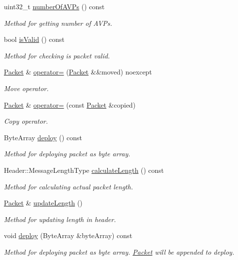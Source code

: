 \begin{DoxyCompactItemize}
uint32\+\_\+t \hyperlink{classDiameter_1_1Packet_a9b11aa0f60e2a9cec525d98f6b1d8808}{number\+Of\+A\+V\+Ps} () const
\begin{DoxyCompactList}\small\item\em Method for getting number of A\+V\+Ps. \end{DoxyCompactList}\item 
bool \hyperlink{classDiameter_1_1Packet_ab6077555d623ff342c4821c0a0e29285}{is\+Valid} () const
\begin{DoxyCompactList}\small\item\em Method for checking is packet valid. \end{DoxyCompactList}\item 
\hyperlink{classDiameter_1_1Packet}{Packet} \& \hyperlink{classDiameter_1_1Packet_a80abbedae208ece043c406a87b8876af}{operator=} (\hyperlink{classDiameter_1_1Packet}{Packet} \&\&moved) noexcept
\begin{DoxyCompactList}\small\item\em Move operator. \end{DoxyCompactList}\item 
\hyperlink{classDiameter_1_1Packet}{Packet} \& \hyperlink{classDiameter_1_1Packet_a38f277e129b9b7d7e31188b48d947506}{operator=} (const \hyperlink{classDiameter_1_1Packet}{Packet} \&copied)
\begin{DoxyCompactList}\small\item\em Copy operator. \end{DoxyCompactList}\item 
Byte\+Array \hyperlink{classDiameter_1_1Packet_a6120f6d21c5d2f4c4ed4a8602953923c}{deploy} () const
\begin{DoxyCompactList}\small\item\em Method for deploying packet as byte array. \end{DoxyCompactList}\item 
Header\+::\+Message\+Length\+Type \hyperlink{classDiameter_1_1Packet_ae9926218252f08fcdbc937d16d496984}{calculate\+Length} () const
\begin{DoxyCompactList}\small\item\em Method for calculating actual packet length. \end{DoxyCompactList}\item 
\hyperlink{classDiameter_1_1Packet}{Packet} \& \hyperlink{classDiameter_1_1Packet_a822041d59387ef2a8c0f48c2c4bc1054}{update\+Length} ()
\begin{DoxyCompactList}\small\item\em Method for updating length in header. \end{DoxyCompactList}\item 
void \hyperlink{classDiameter_1_1Packet_a2a41d20364b4b73787c9cf5af2ee6001}{deploy} (Byte\+Array \&byte\+Array) const
\begin{DoxyCompactList}\small\item\em Method for deploying packet as byte array. \hyperlink{classDiameter_1_1Packet}{Packet} will be appended to deploy. \end{DoxyCompactList}\end{DoxyCompactItemize}


